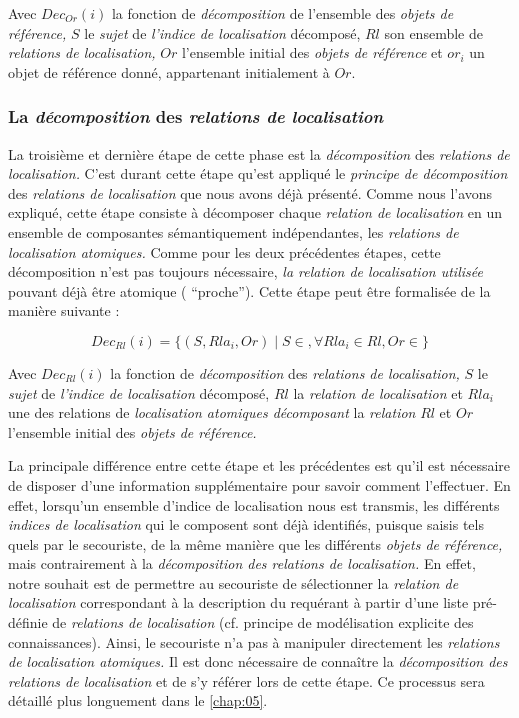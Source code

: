 Avec \(Dec_{Or}(i)\) la fonction de \emph{décomposition} de l'ensemble
des \emph{objets de référence,} \(S\) le \emph{sujet} de \emph{l'indice
  de localisation} décomposé, \(Rl\) son ensemble de \emph{relations
  de localisation,} \(Or\) l'ensemble initial des \emph{objets de
  référence} et \(or_i\) un objet de référence donné, appartenant
initialement à \(Or\).

\subsubsection{La \emph{décomposition} des \emph{relations de localisation}}

La troisième et dernière étape de cette phase est la
\emph{décomposition} des \emph{relations de localisation.} C'est
durant cette étape qu'est appliqué le \emph{principe de décomposition}
des \emph{relations de localisation} que nous avons déjà
présenté. Comme nous l'avons expliqué, cette étape consiste à
décomposer chaque \emph{relation de localisation} en un ensemble de
composantes sémantiquement indépendantes, les \emph{relations de
  localisation atomiques.} Comme pour les deux précédentes étapes,
cette décomposition n'est pas toujours nécessaire, \emph{la relation
  de localisation utilisée} pouvant déjà être atomique (\eg
\enquote{proche}). Cette étape peut être formalisée de la manière
suivante :

\begin{equation}
  Dec_{Rl}(i) = \{(S,Rla_i,Or) \mid S \in, \forall Rla_i \in Rl,  Or \in \} 
\end{equation}

Avec \(Dec_{Rl}(i)\) la fonction de \emph{décomposition} des
\emph{relations de localisation,} \(S\) le \emph{sujet} de
\emph{l'indice de localisation} décomposé, \(Rl\) la \emph{relation de
  localisation} et \(Rla_i\) une des relations de \emph{localisation
  atomiques décomposant} la \emph{relation} \(Rl\) et \(Or\)
l'ensemble initial des \emph{objets de référence.}

La principale différence entre cette étape et les précédentes est
qu'il est nécessaire de disposer d'une information supplémentaire pour
savoir comment l'effectuer. En effet, lorsqu'un ensemble d'indice de
localisation nous est transmis, les différents \emph{indices de
  localisation} qui le composent sont déjà identifiés, puisque saisis
tels quels par le secouriste, de la même manière que les différents
\emph{objets de référence,} mais contrairement à la
\emph{décomposition des relations de localisation.} En effet, notre
souhait est de permettre au secouriste de sélectionner la
\emph{relation de localisation} correspondant à la description du
requérant à partir d'une liste pré-définie de \emph{relations de
  localisation} (cf. principe de modélisation explicite des
connaissances). Ainsi, le secouriste n'a pas à manipuler directement
les \emph{relations de localisation atomiques.} Il est donc nécessaire
de connaître la \emph{décomposition des relations de localisation} et
de s'y référer lors de cette étape. Ce processus sera détaillé plus
longuement dans le \autoref{chap:05}.

